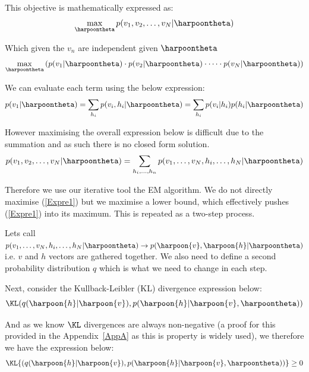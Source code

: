 This objective is mathematically expressed as:
\begin{equation}
    \max_{\harpoontheta} p {(v_1,v_2,\dots,v_N | \harpoontheta)}
\end{equation}

Which given the $v_n$ are independent given $\harpoontheta$
\begin{equation}
    \max_{\harpoontheta} {( p{(v_1|\harpoontheta)}\cdot p{(v_2|\harpoontheta)} \cdot \dots \cdot p{(v_N| \harpoontheta)} )}
\end{equation}

We can evaluate each term using the below expression:
\begin{equation}
    p{(v_1|\harpoontheta)} = \sum_{h_i} p {(v_i,h_i | \harpoontheta)} =
        \sum_{h_i} p {(v_i | h_i)} p {(h_i | \harpoontheta)}
\end{equation}

However maximising the overall expression below is difficult due to the summation and as such there is no closed form solution.
\begin{equation}\label{Expre1}
    p{(v_1,v_2,\dots,v_N | \harpoontheta)} = \sum_{h_i,\dots,h_n} p {(v_1,\dots,v_N,h_i,\dots,h_N | \harpoontheta)}
\end{equation}

Therefore we use our iterative tool the EM algorithm. We do not directly maximise (\ref{Expre1}) but we maximise a lower bound, which effectively pushes (\ref{Expre1}) into its maximum. This is repeated as a two-step process.

Lets call $p {(v_1,\dots,v_N,h_i,\dots,h_N | \harpoontheta)} \rightarrow p{(\harpoon{v},\harpoon{h} | \harpoontheta)}$ i.e. $v$ and $h$ vectors are gathered together. We also need to define a second probability distribution $q$ which is what we need to change in each step.

Next, consider the Kullback-Leibler (KL) divergence expression below:
\begin{equation}
    \KL ( q{(\harpoon{h}|\harpoon{v})},p{(\harpoon{h}|\harpoon{v},\harpoontheta)} )
\end{equation}

And as we know $\KL$ divergences are always non-negative (a proof for this provided in the Appendix~\ref{AppA} as this is property is widely used), we therefore we have the expression below:
\begin{equation}
    \KL {( q{(\harpoon{h}|\harpoon{v})},p{(\harpoon{h}|\harpoon{v},\harpoontheta)} )}\geq 0
\end{equation}

